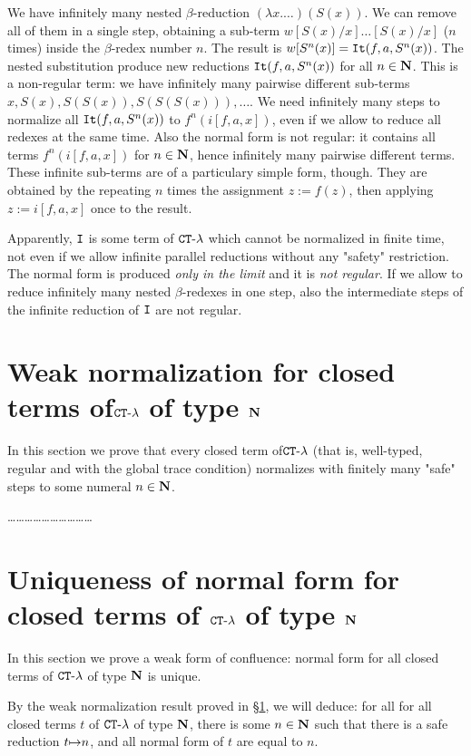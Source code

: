 \documentclass{article}
\begin{document}
We have infinitely many nested $\beta$-reduction $(\lambda x. \ldots)(S(x))$.
We can remove all of them in a single step, obtaining a sub-term
$w[S(x)/x]\ldots[S(x)/x]$ ($n$ times)
inside the $\beta$-redex number $n$. The result is $w[S^n(x)] = {\tt It}(f,a,S^n(x))$.
The nested substitution produce new reductions ${\tt It}(f,a,S^n(x))$ for all $n \in {\bf N}$.
This is a non-regular term: we have infinitely many pairwise different 
sub-terms $x,S(x),S(S(x)), S(S(S(x))), \ldots$.
We need infinitely many steps to normalize all ${\tt It}(f,a,S^n(x))$ to $f^n(i[f,a,x])$, 
even if we allow to reduce all redexes at the same time.
Also the normal form is not regular: it contains all terms $f^n(i[f,a,x])$ for $n \in {\bf N}$, hence
infinitely many pairwise different terms. These infinite sub-terms are of a particulary simple form, though. 
They are obtained by the repeating $n$ times the assignment $z:=f(z)$, then applying $z:=i[f,a,x]$ once
to the result.

Apparently, ${\tt I}$ 
is some term of ${ {\tt CT} \mbox{-} \lambda}$ which cannot be normalized in finite time, not even if we allow
infinite parallel reductions without any "safety" restriction. The normal form is produced \emph{only in the limit}
and it is \emph{not regular}. If we allow to reduce infinitely many nested $\beta$-redexes in one step, also
the intermediate steps of the infinite reduction of ${\tt I}$ are not regular.


\section{Weak normalization for closed terms of${ {\tt CT} \mbox{-} \lambda}$ of type ${\bf N}$}
\label{section-weak-normalization}
In this section we prove that every closed term of${ {\tt CT} \mbox{-} \lambda}$
 (that is, well-typed, regular and with the global trace condition) normalizes with finitely many "safe" steps
to some numeral $n \in {\bf N}$.

\ldots\ldots\ldots\ldots\ldots\ldots\ldots\ldots\ldots\ldots

\section{Uniqueness of normal form for closed terms of ${ {\tt CT} \mbox{-} \lambda}$ of type ${\bf N}$}
In this section we prove a weak form of confluence: normal form for
all closed terms of ${ {\tt CT} \mbox{-} \lambda}$ of type ${\bf N}$ is unique.

By the weak normalization result proved in \S \ref{section-weak-normalization},
we will deduce: for all for all closed terms $t$ of ${ {\tt CT} \mbox{-} \lambda}$ of type ${\bf N}$, 
there is some $n \in {\bf N}$ such that there is a safe reduction $t {\mapsto} n$, and all normal form of $t$
are equal to $n$.
\end{document}
